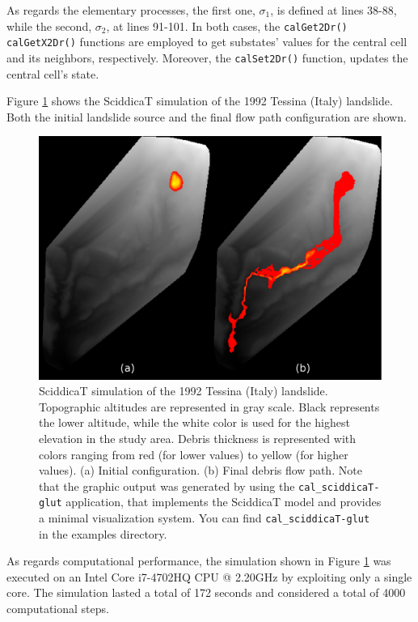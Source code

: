 As regards the elementary processes, the first one, $\sigma_1$, is
defined at lines 38-88, while the second, $\sigma_2$, at lines
91-101. In both cases, the \verb'calGet2Dr()' \verb'calGetX2Dr()'
functions are employed to get substates' values for the central cell and
its neighbors, respectively. Moreover, the \verb'calSet2Dr()'
function, updates the central cell's state.

Figure \ref{fig:sciddicaT} shows the SciddicaT simulation of the 1992
Tessina (Italy) landslide. Both the initial landslide source and the
final flow path configuration are shown.

\begin{figure}[htbp]
  \centering
  \includegraphics[width=11.5cm]{./images/OpenCAL/sciddicaT}
  \caption{SciddicaT simulation of the 1992 Tessina (Italy)
    landslide. Topographic altitudes are represented in gray
    scale. Black represents the lower altitude, while the white color
    is used for the highest elevation in the study area. Debris
    thickness is represented with colors ranging from red (for lower
    values) to yellow (for higher values). (a) Initial
    configuration. (b) Final debris flow path. Note that the graphic
    output was generated by using the \texttt{cal\_sciddicaT-glut}
    application, that implements the SciddicaT model and provides a
    minimal visualization system. You can find \texttt{cal\_sciddicaT-glut} in the examples
    directory.}
  \label{fig:sciddicaT}
\end{figure}

As regards computational performance, the simulation shown in Figure
\ref{fig:sciddicaT} was executed on an Intel Core i7-4702HQ CPU @
2.20GHz by exploiting only a single core. The simulation lasted a
total of 172 seconds and considered a total of 4000 computational steps.

